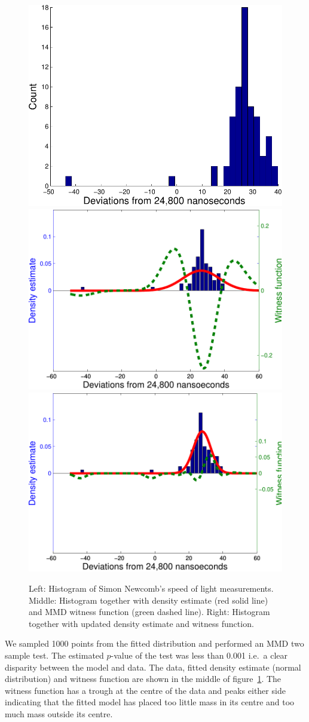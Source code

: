\documentclass{article} %
\def\ie{i.e.\ }
\begin{document}
\begin{figure}[ht]
\centering
\includegraphics[width=0.29\columnwidth]{figures/newcomb_hist}
\includegraphics[width=0.32\columnwidth]{figures/newcomb_witness_1}
\includegraphics[width=0.32\columnwidth]{figures/newcomb_witness_2}
\caption{
Left: Histogram of Simon Newcomb's speed of light measurements.
Middle: Histogram together with density estimate (red solid line) and MMD witness function (green dashed line).
Right: Histogram together with updated density estimate and witness function.
}
\label{fig:newcomb}
\end{figure}

We sampled 1000 points from the fitted distribution and performed an MMD two sample test\footnotemark.
The estimated $p$-value of the test was less than 0.001 \ie a clear disparity between the model and data.
The data, fitted density estimate (normal distribution) and witness function are shown in the middle of figure~\ref{fig:newcomb}.
The witness function has a trough at the centre of the data and peaks either side indicating that the fitted model has placed too little mass in its centre and too much mass outside its centre.

\end{document}
